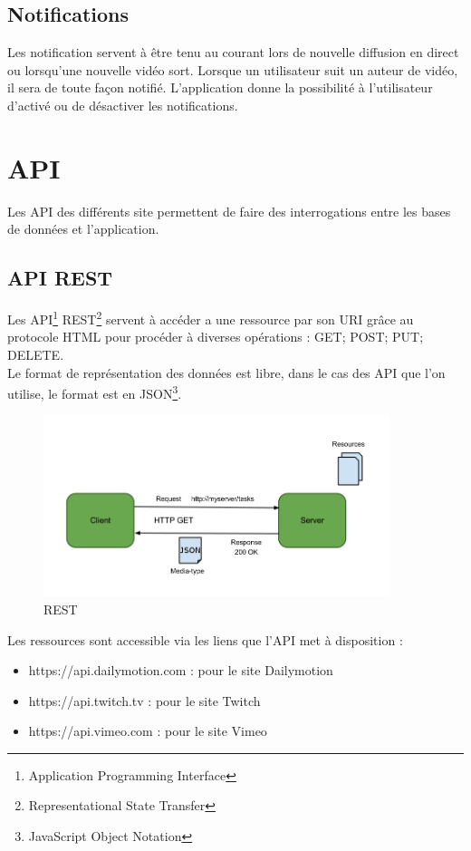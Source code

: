 \documentclass[11pt]{report} %
\begin{document}
		\subsection{Notifications}
		Les notification servent à être tenu au courant lors de nouvelle diffusion en direct ou lorsqu'une nouvelle vidéo sort.
		Lorsque un utilisateur suit un auteur de vidéo, il sera de toute façon notifié.
		L'application donne la possibilité à l'utilisateur d'activé ou de désactiver les notifications.
		
		
	\newpage
	\section{API}
	\label{api}
	Les API des différents site permettent de faire des interrogations entre les bases de données et l'application.
		\subsection{API REST}
		Les API\footnote{Application Programming Interface} REST\footnote{Representational State Transfer} servent à accéder a une ressource par son URI grâce au protocole HTML pour procéder à diverses opérations : GET; POST; PUT; DELETE. \\		
		Le format de représentation des données est libre, dans le cas des API que l'on utilise, le format est en JSON\footnote{JavaScript Object Notation}.
		
		\begin{figure}[h]
			\center
			\includegraphics[width=0.9\textwidth]{../img/rest.png}
			\caption{REST}
			\label{rest}
		\end{figure}
		
		\noindent
		Les ressources sont accessible via les liens que l'API met à disposition :

		\begin{itemize}
		\item https://api.dailymotion.com : pour le site Dailymotion
		\item https://api.twitch.tv : pour le site Twitch
		\item https://api.vimeo.com : pour le site Vimeo
		\end{itemize}
		
\end{document}
